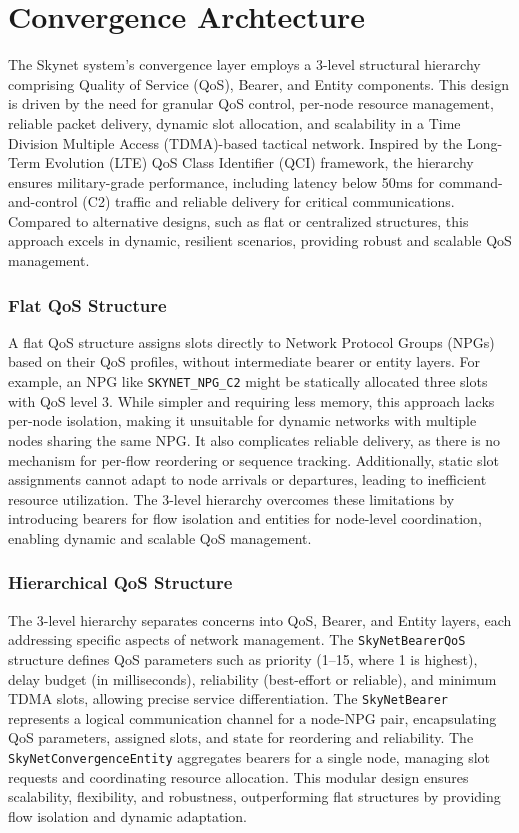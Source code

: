 \documentclass{article}
\begin{document}
\section{Convergence Archtecture}
The Skynet system's convergence layer employs a 3-level structural hierarchy comprising
Quality of Service (QoS), Bearer, and Entity components. This design is driven by the
need for granular QoS control, per-node resource management, reliable packet delivery,
dynamic slot allocation, and scalability in a Time Division Multiple Access (TDMA)-based
tactical network. Inspired by the Long-Term Evolution (LTE) QoS Class Identifier (QCI)
framework, the hierarchy ensures military-grade performance, including latency below
50ms for command-and-control (C2) traffic and reliable delivery for critical communications.
Compared to alternative designs, such as flat or centralized structures, this approach
excels in dynamic, resilient scenarios, providing robust and scalable QoS management.

\subsubsection{Flat QoS Structure}
A flat QoS structure assigns slots directly to Network Protocol Groups (NPGs) based
on their QoS profiles, without intermediate bearer or entity layers. For example,
an NPG like \texttt{SKYNET\_NPG\_C2} might be statically allocated three slots with
QoS level 3. While simpler and requiring less memory, this approach lacks per-node
isolation, making it unsuitable for dynamic networks with multiple nodes sharing
the same NPG. It also complicates reliable delivery, as there is no mechanism for
per-flow reordering or sequence tracking. Additionally, static slot assignments
cannot adapt to node arrivals or departures, leading to inefficient resource
utilization. The 3-level hierarchy overcomes these limitations by introducing
bearers for flow isolation and entities for node-level coordination, enabling
 dynamic and scalable QoS management.

\subsubsection{Hierarchical QoS Structure}
The 3-level hierarchy separates concerns into QoS, Bearer, and Entity layers,
each addressing specific aspects of network management. The \texttt{SkyNetBearerQoS}
structure defines QoS parameters such as priority (1--15, where 1 is highest),
delay budget (in milliseconds), reliability (best-effort or reliable),
and minimum TDMA slots, allowing precise service differentiation.
The \texttt{SkyNetBearer} represents a logical communication channel for a node-NPG pair,
encapsulating QoS parameters, assigned slots, and state for reordering and reliability.
The \texttt{SkyNetConvergenceEntity} aggregates bearers for a single node,
managing slot requests and coordinating resource allocation.
This modular design ensures scalability, flexibility, and robustness,
outperforming flat structures by providing flow isolation and dynamic adaptation.
\end{document}
